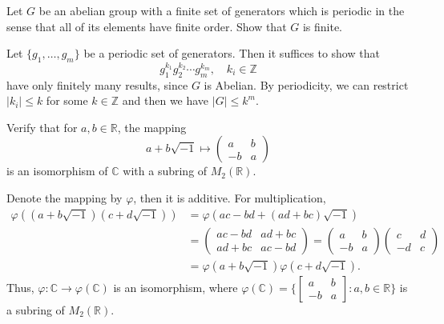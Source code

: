 \setcounter{pb}{20} 
\begin{problem}
    Let $ G $ be an abelian group with a finite set of generators which is periodic in the sense that all of its elements have finite order. Show that $ G $ is finite.
\end{problem}

\begin{solution}
    Let $\{g_{1},\dots,g_{m}\}$ be a  periodic set of generators. Then it suffices to show that
        \[
            g_{1}^{k_{1}}g_{2}^{k_{2}}\cdots g_{m}^{k_{m}},\quad k_{i}\in\mathbb{Z}
        \]
    have only finitely many results, since $G$ is Abelian. By periodicity, we can restrict $|k_{i}|\leq k$ for some $k\in\mathbb{Z}$ and then 
    we have $|G|\leq k^{m}$.
\end{solution}

\setcounter{pb}{24}
\begin{problem}
    Verify that for $ a, b \in \mathbb{R} $, the mapping  
    \[
    a + b \sqrt{-1} \mapsto 
    \begin{pmatrix}
        a & b \\
        -b & a
    \end{pmatrix}
    \]
    is an isomorphism of $\mathbb{C}$ with a subring of $ M_2(\mathbb{R}) $.
\end{problem}

\begin{solution}
    Denote the mapping by $\varphi$, then it is additive. For multiplication, 
        \[
            \begin{split}
                \varphi((a+b\sqrt{-1})(c+d\sqrt{-1}))
                &=\varphi(a c-b d+(a d+b c)\sqrt{-1})\\
                &=
                \begin{pmatrix}
                    a c-b d& a d+b c\\
                    a d+b c& a c-b d
                \end{pmatrix}
                =
                \begin{pmatrix}
                    a & b \\
                    -b & a
                \end{pmatrix}
                \begin{pmatrix}
                    c & d \\
                    -d & c            
                \end{pmatrix}\\
                &=\varphi(a+b\sqrt{-1})\varphi(c+d\sqrt{-1}).
            \end{split}
        \]
    Thus, $\varphi\colon \mathbb{C}\to\varphi(\mathbb{C})$ is an isomorphism, where $\varphi(\mathbb{C})=\Bigg\{
    \begin{bmatrix}
        a&b\\-b&a
    \end{bmatrix}:a,b\in\mathbb{R}\Bigg\}$ is a subring of $M_{2}(\mathbb{R})$. 
\end{solution}

